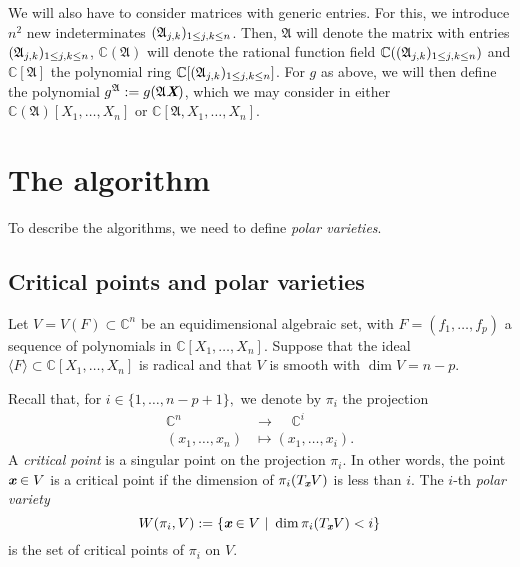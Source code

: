 \documentclass[a4paper]{article}
\def\A{\mathfrak{A}}
\def\Xb{\textit{\textbf{X}}}
\def\xb{\textit{\textbf{x}}}
\def\C{\mathbb{C}}
\def\Wi{W(\pi_i,V)}
\begin{document}
We will also have to consider matrices with generic entries. For this,
we introduce $n^2$ new indeterminates $(\frak A_{j,k})_{1\le j,k \le
  n}$. Then, $\A$ will denote the matrix with entries $(\frak
A_{j,k})_{1\le j,k \le n}$, $\C(\A)$ will denote the rational function
field $\C((\frak A_{j,k})_{1\le j,k \le n})$ and $\C[\A]$ the
polynomial ring $\C[(\frak A_{j,k})_{1\le j,k \le n}]$.  For $g$ as
above, we will then define the polynomial $g^\A:=g(\A \Xb)$, 
which we may consider in either
$\C(\A)[X_1,\dots,X_n]$ or $\C[\A,X_1,\dots,X_n]$.




\section{The algorithm}
To describe the algorithms, we need to
define {\em polar varieties}. 


\subsection{Critical points and polar varieties} 
Let $V=V(F)\subset \C^n$ be an equidimensional algebraic set, with $F = (f_1,\hdots,f_p)$ a sequence of polynomials in  $\C[X_1,\hdots,X_n]$. Suppose that the ideal $\langle F \rangle \subset \C[X_1,\hdots,X_n]$ is radical and that $V$ is smooth with $\dim V = n-p$.

Recall that, for $i \in
\{1,\hdots,n-p+1\},$ we denote by $\pi_i$ the projection 
%
\begin{align*}
\C^n~~~~~ &\rightarrow~~~~~ \C^i \\
(x_1,\hdots,x_n) &\mapsto  (x_1,\hdots,x_i).    
\end{align*} 
%
A \textit{critical point} is a singular point on the projection $\pi_i.$ In other words, the point $\xb \in V$ is a critical point if the dimension of $\pi_i( T_{\xb}V)$ is less than $i$.
The $i$-th
\textit{polar variety} 
\[
\Wi := \left\{\xb \in V~|~\dim \pi_i(T_\xb
V) < i\right\}
\]
is the set of critical points of $\pi_i$ on $V$. 
%
\end{document}
